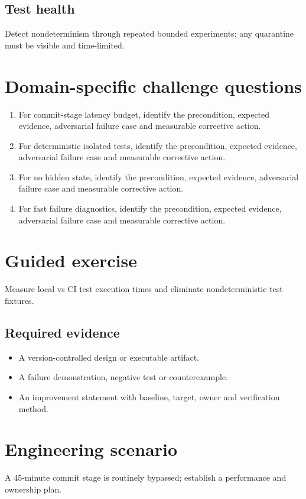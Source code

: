 \documentclass[10pt,letterpaper]{article}
\begin{document}
\subsection{Test health}
Detect nondeterminism through repeated bounded experiments; any quarantine must be visible and time-limited.

\section{Domain-specific challenge questions}
\begin{enumerate}
\item For commit-stage latency budget, identify the precondition, expected evidence, adversarial failure case and measurable corrective action.
\item For deterministic isolated tests, identify the precondition, expected evidence, adversarial failure case and measurable corrective action.
\item For no hidden state, identify the precondition, expected evidence, adversarial failure case and measurable corrective action.
\item For fast failure diagnostics, identify the precondition, expected evidence, adversarial failure case and measurable corrective action.
\end{enumerate}
\section{Guided exercise}
Measure local vs CI test execution times and eliminate nondeterministic test fixtures.

\subsection{Required evidence}
\begin{itemize}
\item A version-controlled design or executable artifact.
\item A failure demonstration, negative test or counterexample.
\item An improvement statement with baseline, target, owner and verification method.
\end{itemize}


\section{Engineering scenario}
A 45-minute commit stage is routinely bypassed; establish a performance and ownership plan.
\end{document}
